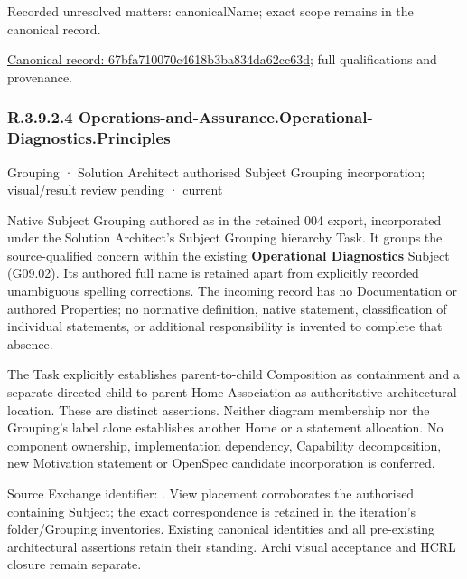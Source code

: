 {\small Recorded unresolved matters: canonicalName; exact scope remains in the canonical record.}\par
{\footnotesize \href{../../../../continuum/grouping/67bfa710070c4618b3ba834da62cc63d.md}{Canonical record: 67bfa710070c4618b3ba834da62cc63d}; full qualifications and provenance.}\par
\subsubsection*{R.3.9.2.4 Operations-and-Assurance.Operational-Diagnostics.Principles}
\label{navigation:R.3.9.2.4}

\label{element:1eb3b965c7334b899133282bc0500a9d}
{\small Grouping · Solution Architect authorised Subject Grouping incorporation; visual/result review pending · current}\par

Native Subject Grouping authored as \texttt{} in the retained 004 export,
incorporated under the Solution Architect's Subject Grouping hierarchy Task.
It groups the source-qualified \texttt{} concern within
the existing \textbf{Operational Diagnostics} Subject (G09.02). Its authored full name
is retained apart from explicitly recorded unambiguous spelling corrections.
The incoming record has no Documentation or authored Properties; no normative
definition, native statement, classification of individual statements, or
additional responsibility is invented to complete that absence.



The Task explicitly establishes parent-to-child Composition as containment and
a separate directed child-to-parent Home Association as authoritative architectural
location. These are distinct assertions. Neither diagram membership nor the
Grouping's label alone establishes another Home or a statement allocation.
No component ownership, implementation dependency, Capability decomposition,
new Motivation statement or OpenSpec candidate incorporation is conferred.



Source Exchange identifier: \texttt{}. View placement corroborates
the authorised containing Subject; the exact correspondence is retained in the
iteration's folder/Grouping inventories. Existing canonical identities and all
pre-existing architectural assertions retain their standing. Archi visual
acceptance and HCRL closure remain separate.



